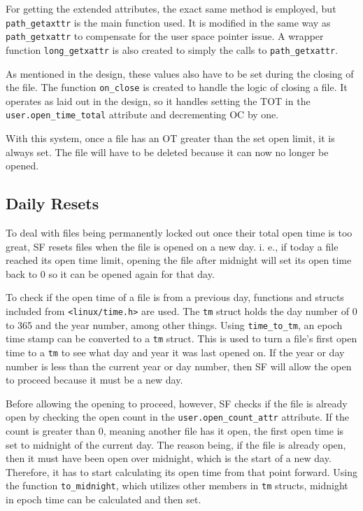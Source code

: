 For getting the extended attributes, the exact same method is employed, but \texttt{path\_getaxttr} is the main function used. It is modified in the same way as \texttt{path\_getxattr} to compensate for the user space pointer issue. A wrapper function \texttt{long\_getxattr} is also created to simply the calls to \texttt{path\_getxattr}.

As mentioned in the design, these values also have to be set during the closing of the file. The function \texttt{on\_close} is created to handle the logic of closing a file. It operates as laid out in the design, so it handles setting the TOT in the \texttt{user.open\_time\_total} attribute and decrementing OC by one.

With this system, once a file has an OT greater than the set open limit, it is always set. The file will have to be deleted because it can now no longer be opened.

\subsection{Daily Resets}

To deal with files being permanently locked out once their total open time is too great, SF resets files when the file is opened on a new day. i. e., if today a file reached its open time limit, opening the file after midnight will set its open time back to 0 so it can be opened again for that day.

To check if the open time of a file is from a previous day, functions and structs included from \texttt{<linux/time.h>} are used. The \texttt{tm} struct holds the day number of 0 to 365 and the year number, among other things. Using \texttt{time\_to\_tm}, an epoch time stamp can be converted to a \texttt{tm} struct. This is used to turn a file's first open time to a \texttt{tm} to see what day and year it was last opened on. If the year or day number is less than the current year or day number, then SF will allow the open to proceed because it must be a new day.

Before allowing the opening to proceed, however, SF checks if the file is already open by checking the open count in the \texttt{user.open\_count\_attr} attribute. If the count is greater than 0, meaning another file has it open, the first open time is set to midnight of the current day. The reason being, if the file is already open, then it must have been open over midnight, which is the start of a new day. Therefore, it has to start calculating its open time from that point forward. Using the function \texttt{to\_midnight}, which utilizes other members in \texttt{tm} structs, midnight in epoch time can be calculated and then set.

